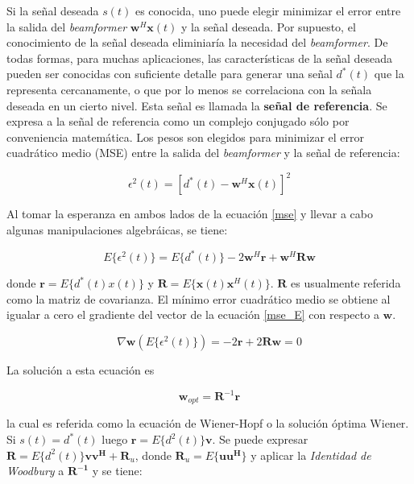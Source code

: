 Si la señal deseada $s(t)$ es conocida, uno puede elegir minimizar el error entre la salida del \textit{beamformer} $\mathbf{w}^H \mathbf{x}(t)$ y la señal deseada. Por supuesto, el conocimiento de la señal deseada eliminiaría la necesidad del \textit{beamformer}. De todas formas, para muchas aplicaciones, las características de la señal deseada pueden ser conocidas con suficiente detalle para generar una señal $d^*(t)$ que la representa cercanamente, o que por lo menos se correlaciona con la señala deseada en un cierto nivel. Esta señal es llamada la \textbf{señal de referencia}. Se expresa a la señal de referencia como un complejo conjugado sólo por conveniencia matemática. Los pesos son elegidos para minimizar el error cuadrático medio (MSE) entre la salida del \textit{beamformer} y la señal de referencia:

\begin{equation}
\epsilon^2(t) = [d^*(t) - \mathbf{w}^H \mathbf{x}(t)]^2
\label{mse}
\end{equation}

Al tomar la esperanza en ambos lados de la ecuación \eqref{mse} y llevar a cabo algunas manipulaciones algebráicas, se tiene:

\begin{equation}
E\{\epsilon^2(t)\} = E\{d^*(t)\} - 2 \mathbf{w}^H \mathbf{r} + \mathbf{w}^H \mathbf{R} \mathbf{w}
\label{mse_E}
\end{equation}

donde $\mathbf{r} = E\{d^*(t)x(t)\}$ y $\mathbf{R} = E\{\mathbf{x}(t)\mathbf{x}^H(t)\}$. $\mathbf{R}$ es usualmente referida como la matriz de covarianza. El mínimo error cuadrático medio se obtiene al igualar a cero el gradiente del vector de la ecuación \eqref{mse_E} con respecto a $\mathbf{w}$.

\begin{equation}
\nabla \mathbf{w} (E\{ \epsilon^2(t)\}) = -2 \mathbf{r} + 2 \mathbf{R} \mathbf{w} = 0
\label{nabla_to_zero}
\end{equation}

La solución a esta ecuación es

\begin{equation}
\mathbf{w}_{opt} = \mathbf{R}^{-1} \mathbf{r}
\label{wiener}
\end{equation}

la cual es referida como la ecuación de Wiener-Hopf o la solución óptima Wiener. Si $s(t) = d^*(t)$ luego $\mathbf{r} = E\{d^2(t)\} \mathbf{v}$. Se puede expresar $\mathbf{R} = E\{d^2(t)\} \mathbf{v v^H} + \mathbf{R}_u$, donde $\mathbf{R}_u = E\{\mathbf{u u^H}\}$ y aplicar la \textit{Identidad de Woodbury} a $\mathbf{R^{-1}}$ y se tiene:

